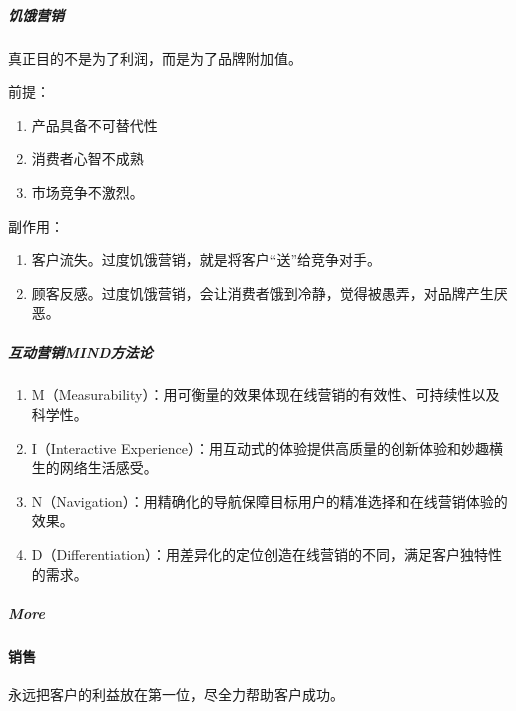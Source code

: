 \documentclass[letterpaper,11pt,english]{sphinxmanual}
\begin{document}
\subparagraph{饥饿营销}
\label{\detokenize{chapter_idea/GTM:id18}}
真正目的不是为了利润，而是为了品牌附加值。

前提：
\begin{enumerate}
%
\item {} 
产品具备不可替代性

\item {} 
消费者心智不成熟

\item {} 
市场竞争不激烈。

\end{enumerate}

副作用：
\begin{enumerate}
%
\item {} 
客户流失。过度饥饿营销，就是将客户“送”给竞争对手。

\item {} 
顾客反感。过度饥饿营销，会让消费者饿到冷静，觉得被愚弄，对品牌产生厌恶。

\end{enumerate}


\subparagraph{互动营销MIND方法论}
\label{\detokenize{chapter_idea/GTM:mind}}\begin{enumerate}
%
\item {} 
M（Measurability）：用可衡量的效果体现在线营销的有效性、可持续性以及科学性。

\item {} 
I（Interactive
Experience）：用互动式的体验提供高质量的创新体验和妙趣横生的网络生活感受。

\item {} 
N（Navigation）：用精确化的导航保障目标用户的精准选择和在线营销体验的效果。

\item {} 
D（Differentiation）：用差异化的定位创造在线营销的不同，满足客户独特性的需求。

\end{enumerate}


\subparagraph{More}
\label{\detokenize{chapter_idea/GTM:more}}


\paragraph{销售}
\label{\detokenize{chapter_idea/GTM:id19}}
永远把客户的利益放在第一位，尽全力帮助客户成功。
\end{document}
